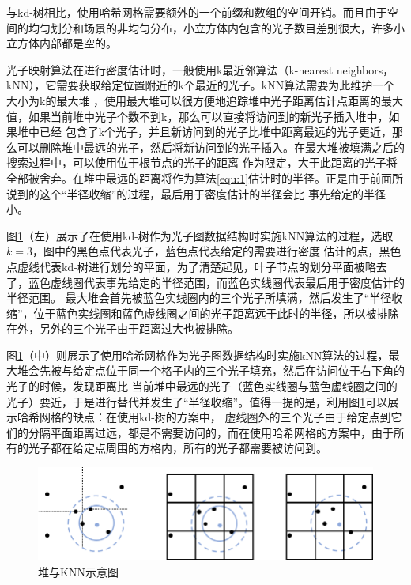 \documentclass[UTF8]{ctexart}
\begin{document}
        与kd-树相比，使用哈希网格需要额外的一个前缀和数组的空间开销。而且由于空间的均匀划分和场景的非均匀分布，小立方体内包含的光子数目差别很大，许多小立方体内部都是空的。
        
        光子映射算法在进行密度估计时，一般使用k最近邻算法（k-nearest neighbors，kNN），它需要获取给定位置附近的k个最近的光子。kNN算法需要为此维护一个大小为k的最大堆
        \cite{jensen2000practical}，使用最大堆可以很方便地追踪堆中光子距离估计点距离的最大值，如果当前堆中光子个数不到k，那么可以直接将访问到的新光子插入堆中，如果堆中已经
        包含了k个光子，并且新访问到的光子比堆中距离最远的光子更近，那么可以删除堆中最远的光子，然后将新访问到的光子插入。在最大堆被填满之后的搜索过程中，可以使用位于根节点的光子的距离
        作为限定，大于此距离的光子将全部被舍弃。在堆中最远的距离将作为算法\ref{equ:1}估计时的半径。正是由于前面所说到的这个“半径收缩”的过程，最后用于密度估计的半径会比
        事先给定的半径小\cite{2003Photon}。
        
        图\ref{fig:6}（左）展示了在使用kd-树作为光子图数据结构时实施kNN算法的过程，选取$k=3$，图中的黑色点代表光子，蓝色点代表给定的需要进行密度
        估计的点，黑色点虚线代表kd-树进行划分的平面，为了清楚起见，叶子节点的划分平面被略去了，蓝色虚线圈代表事先给定的半径范围，而蓝色实线圈代表最后用于密度估计的半径范围。
        最大堆会首先被蓝色实线圈内的三个光子所填满，然后发生了“半径收缩”，位于蓝色实线圈和蓝色虚线圈之间的光子距离远于此时的半径，所以被排除在外，另外的三个光子由于距离过大也被排除。

        图\ref{fig:6}（中）则展示了使用哈希网格作为光子图数据结构时实施kNN算法的过程，最大堆会先被与给定点位于同一个格子内的三个光子填充，然后在访问位于右下角的光子的时候，发现距离比
        当前堆中最远的光子（蓝色实线圈与蓝色虚线圈之间的光子）要近，于是进行替代并发生了“半径收缩”。值得一提的是，利用图\ref{fig:6}可以展示哈希网格的缺点：在使用kd-树的方案中，
        虚线圈外的三个光子由于给定点到它们的分隔平面距离过远，都是不需要访问的，而在使用哈希网格的方案中，由于所有的光子都在给定点周围的方格内，所有的光子都需要被访问到。

        \begin{figure}[htbp]
        \centering
        \includegraphics[scale=0.8]{pic/KNN.png}
        \caption{堆与KNN示意图}
        \label{fig:6}
        \end{figure}
\end{document}
